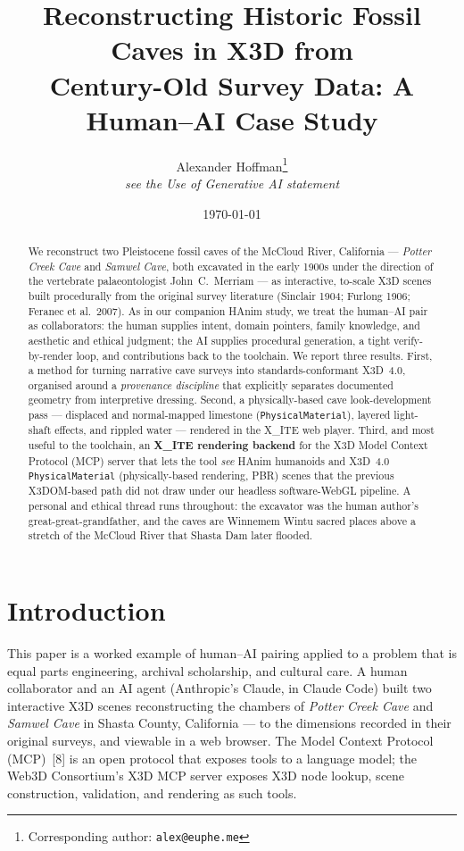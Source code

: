 \documentclass[11pt]{article}
\title{\textbf{Reconstructing Historic Fossil Caves in X3D from\\
Century-Old Survey Data: A Human--AI Case Study}}
\author{Alexander Hoffman\thanks{Corresponding author: \texttt{alex@euphe.me}}\\[2pt]
  \small\textit{see the Use of Generative AI statement}}
\date{\today}
\newcommand{\xite}{X\_ITE}
\begin{document}
\maketitle

\begin{abstract}
We reconstruct two Pleistocene fossil caves of the McCloud River, California ---
\emph{Potter Creek Cave} and \emph{Samwel Cave}, both excavated in the early
1900s under the direction of the vertebrate palaeontologist John~C.~Merriam ---
as interactive, to-scale X3D scenes built procedurally from the original survey
literature (Sinclair 1904; Furlong 1906; Feranec et al.\ 2007). As in our
companion HAnim study, we treat the human--AI pair as collaborators: the human
supplies intent, domain pointers, family knowledge, and aesthetic and ethical
judgment; the AI supplies procedural generation, a tight verify-by-render loop,
and contributions back to the toolchain. We report three results. First, a method
for turning narrative cave surveys into standards-conformant X3D~4.0, organised
around a \emph{provenance discipline} that explicitly separates documented
geometry from interpretive dressing. Second, a physically-based cave
look-development pass --- displaced and normal-mapped limestone
(\texttt{PhysicalMaterial}), layered light-shaft effects, and rippled water ---
rendered in the \xite{} web player. Third, and most useful to the toolchain, an
\textbf{\xite{} rendering backend} for the X3D Model Context Protocol (MCP) server
that lets the tool \emph{see} HAnim humanoids and X3D~4.0 \texttt{PhysicalMaterial}
(physically-based rendering, PBR) scenes that the previous X3DOM-based path did
not draw under our headless software-WebGL pipeline. A personal and ethical thread
runs throughout: the excavator was the human author's great-great-grandfather, and
the caves are Winnemem Wintu sacred places above a stretch of the McCloud River
that Shasta Dam later flooded.
\end{abstract}

\section{Introduction}

This paper is a worked example of human--AI pairing applied to a problem that is
equal parts engineering, archival scholarship, and cultural care. A human
collaborator and an AI agent (Anthropic's Claude, in Claude Code) built two
interactive X3D scenes reconstructing the chambers of \emph{Potter Creek Cave}
and \emph{Samwel Cave} in Shasta County, California --- to the dimensions
recorded in their original surveys, and viewable in a web browser. The Model
Context Protocol (MCP)~[8] is an open protocol that exposes tools to a language
model; the Web3D Consortium's X3D MCP server exposes X3D node lookup, scene
construction, validation, and rendering as such tools.
\end{document}
